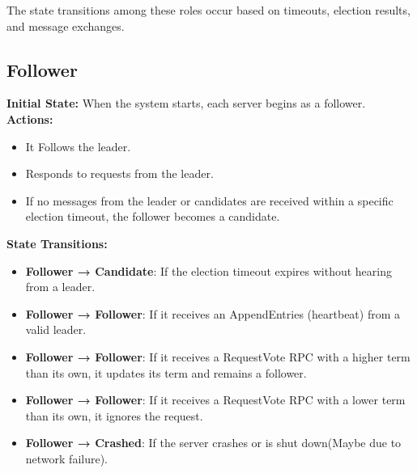 The state transitions among these roles occur based on timeouts, election
results, and message exchanges.
\subsection{Follower}

\textbf{Initial State:} When the system starts, each server begins as a follower.
\newline
\textbf{Actions:}
\begin{itemize}
    \item It Follows the leader.

    \item Responds to requests from the leader.

    \item If no messages from the leader or candidates are received within a specific
        election timeout, the follower becomes a candidate.
\end{itemize}

\textbf{State Transitions:}

\begin{itemize}
    \item \textbf{Follower → Candidate}: If the election timeout expires without
        hearing from a leader.

    \item \textbf{Follower → Follower}: If it receives an AppendEntries (heartbeat)
        from a valid leader.

    \item \textbf{Follower → Follower}: If it receives a RequestVote RPC with a higher
        term than its own, it updates its term and remains a follower.

    \item \textbf{Follower → Follower}: If it receives a RequestVote RPC with a lower
        term than its own, it ignores the request.

    \item \textbf{Follower → Crashed}: If the server crashes or is shut down(Maybe
        due to network failure).
\end{itemize}

